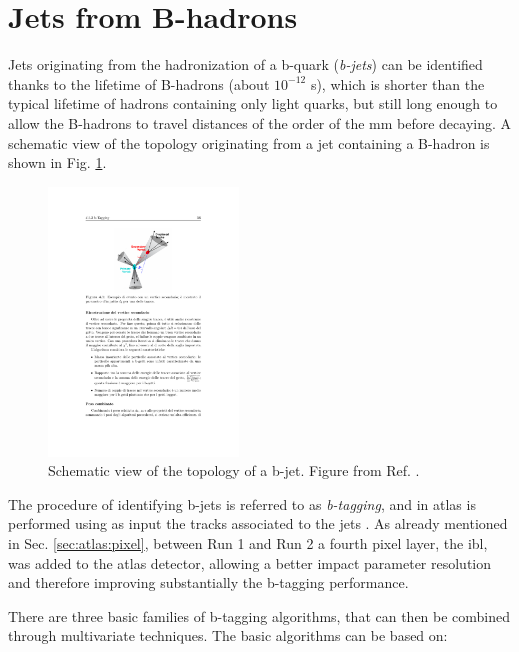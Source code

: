 \section{Jets from B-hadrons}
\label{sec:btagging}

Jets originating from the hadronization of a b-quark (\textit{b-jets}) can be identified thanks to the lifetime of B-hadrons (about $10^{-12}$ s), which is shorter than the typical lifetime of hadrons containing only light quarks, but still long enough to allow the B-hadrons to travel distances of the order of the mm before decaying. A schematic view of the topology originating from a jet containing a B-hadron is shown in Fig. \ref{fig:btag}. 
\begin{figure}[h]
\begin{center}
\includegraphics[width=0.45\textwidth]{./figures/objects/secvtx.pdf}
\end{center}
\caption[Schematic view of the topology of a b-jet.]{Schematic view of the topology of a b-jet. Figure from Ref. \cite{d0btagging}.}
\label{fig:btag}
\end{figure}
The procedure of identifying b-jets is referred to as \textit{b-tagging}, and in \gls{atlas} is performed using as input the tracks associated to the jets . As already mentioned in Sec. \ref{sec:atlas:pixel}, between Run 1 and Run 2 a fourth pixel layer, the \gls{ibl}, was added to the \gls{atlas} detector, allowing a better impact parameter resolution and therefore improving substantially the b-tagging performance. 

There are three basic families of b-tagging algorithms, that can then be combined through multivariate techniques. The basic algorithms can be based on:

